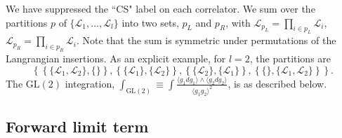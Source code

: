 \documentclass[12pt]{article}
\numberwithin{equation}{section}
\begin{document}
We have suppressed the ``CS" label on each correlator. We sum over the partitions $p$ of $\{\mathcal{L}_1,\hdots,\mathcal{L}_l\}$ into two sets, $p_L$ and $p_R$, with $\mathcal{L}_{p_L}=\prod_{i\in p_L}\mathcal{L}_i$, $\mathcal{L}_{p_R}=\prod_{i\in p_R}\mathcal{L}_i$. Note that the sum is symmetric under permutations of the Langrangian insertions. As an explicit example, for $l=2$, the partitions are
\begin{equation}
    \left\{\left\{ \{\mathcal{L}_1,\mathcal{L}_2\},\{\}\right\},\left\{ \{\mathcal{L}_1\},\{\mathcal{L}_2\}\right\},\left\{ \{\mathcal{L}_2\},\{\mathcal{L}_1\}\right\},\left\{\{\},\{\mathcal{L}_1,\mathcal{L}_2\}\right\}\right\}.
\end{equation}
The $\textrm{GL}(2)$ integration, $\int_{\textrm{GL}(2)}\equiv\int \frac{\langle g_1 dg_1\rangle \wedge \langle g_2 dg_2 \rangle}{\langle g_1 g_2 \rangle^2}$, is as described below.

\subsection{Forward limit term}
\end{document}
